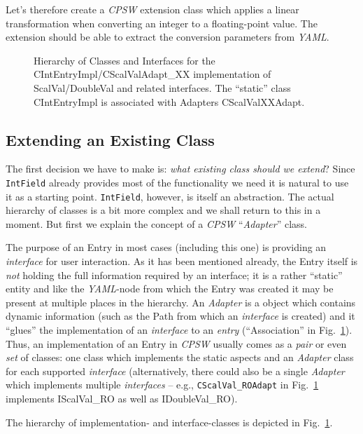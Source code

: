 \documentclass[10pt]{article}
\newcommand{\ita}[1]{\emph{#1}}
\newcommand{\cpsw}      {\ita {CPSW}}
\newcommand{\yaml}      {\ita {YAML}}
\newcommand{\entry}     {{Entry}}
\newcommand{\Path}      {{Path}}
\newcommand{\cod}[1] {{\tt#1}}
\newcounter{figs}
\newcommand{\fig}[2]{
\refstepcounter{figs}
\hspace*{\fill}\resizebox{#1}{!}{\texttt{[image: \#2]}}\hspace*{\fill}
}
\newcommand{\figr}[1]{Fig.~\ref{fig:#1}}
\begin{document}
Let's therefore create a \cpsw{} extension class which applies a linear transformation
when converting an integer to a floating-point value. The extension should be able
to extract the conversion parameters from \yaml{}.

\begin{figure}[htb]
\fig{0.9\textwidth}{O.Common/classhier.pdf}
\label{fig:classhier}
\caption{Hierarchy of Classes and Interfaces for the CIntEntryImpl/CScalValAdapt\_XX 
implementation of ScalVal/DoubleVal and related interfaces. The ``static'' class
CIntEntryImpl is associated with Adapters CScalValXXAdapt.}
\end{figure}


\subsection{Extending an Existing Class}
The first decision we have to make is: {\em what existing class should we extend}?
Since \cod{IntField} already provides most of the functionality we need it is natural
to use it as a starting point. \cod{IntField}, however, is itself an abstraction. The
actual hierarchy of classes is a bit more complex and we shall return to this in a
moment. But first we explain the concept of a \cpsw{} ``{\em Adapter}'' class.

The purpose of an \entry{} in most cases (including this one) is providing an
{\em interface} for user interaction. As it has been mentioned already, the \entry{}
itself is {\em not} holding the full information required by an interface; it is
a rather ``static'' entity and like the \yaml{}-node from which the \entry{} was
created it may be present at multiple places in the hierarchy. An {\em Adapter}
is a object which contains dynamic information (such as the \Path{}
from which an {\em interface} is created) and it ``glues'' the implementation of
an {\em interface} to an {\em entry} (``Association'' in \figr{classhier}).
Thus, an implementation of an \entry{} in \cpsw{} usually comes as a {\em pair} or
even {\em set} of classes: one class which implements the static aspects and an
{\em Adapter} class for each supported {\em interface} (alternatively, there could
also be a single {\em Adapter} which implements multiple {\em interfaces} -- e.g.,
\cod{CScalVal\_ROAdapt} in \figr{classhier} implements IScalVal\_RO as well
as IDoubleVal\_RO).

The hierarchy of implementation- and interface-classes is depicted in \figr{classhier}.
\end{document}
